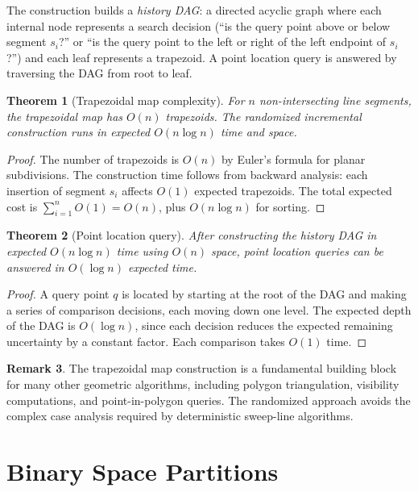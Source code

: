\documentclass[twoside,12pt]{book}
\theoremstyle{plain}
\newtheorem{theorem}{Theorem}[chapter]
\theoremstyle{definition}
\newtheorem{remark}[theorem]{Remark}
\theoremstyle{remark}
\begin{document}
The construction builds a \emph{history DAG}: a directed acyclic graph where each internal node represents a search decision (``is the query point above or below segment $s_i$?'' or ``is the query point to the left or right of the left endpoint of $s_i$?'') and each leaf represents a trapezoid. A point location query is answered by traversing the DAG from root to leaf.

\begin{theorem}[Trapezoidal map complexity]
\label{thm:trapezoidal}
For $n$ non-intersecting line segments, the trapezoidal map has $O(n)$ trapezoids. The randomized incremental construction runs in expected $O(n \log n)$ time and space.
\end{theorem}

\begin{proof}
The number of trapezoids is $O(n)$ by Euler's formula for planar subdivisions. The construction time follows from backward analysis: each insertion of segment $s_i$ affects $O(1)$ expected trapezoids. The total expected cost is $\sum_{i=1}^{n} O(1) = O(n)$, plus $O(n \log n)$ for sorting.
\end{proof}

\begin{theorem}[Point location query]
\label{thm:point-location}
After constructing the history DAG in expected $O(n \log n)$ time using $O(n)$ space, point location queries can be answered in $O(\log n)$ expected time.
\end{theorem}

\begin{proof}
A query point $q$ is located by starting at the root of the DAG and making a series of comparison decisions, each moving down one level. The expected depth of the DAG is $O(\log n)$, since each decision reduces the expected remaining uncertainty by a constant factor. Each comparison takes $O(1)$ time.
\end{proof}

\begin{remark}
The trapezoidal map construction is a fundamental building block for many other geometric algorithms, including polygon triangulation, visibility computations, and point-in-polygon queries. The randomized approach avoids the complex case analysis required by deterministic sweep-line algorithms.
\end{remark}

\section{Binary Space Partitions}
\label{sec:bsp}
\end{document}
